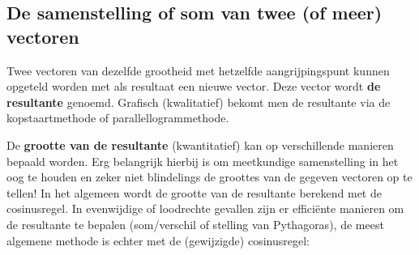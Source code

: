 \documentclass{ximera}
\begin{document}
\subsection*{De samenstelling of som van twee (of meer) vectoren}

Twee vectoren van dezelfde grootheid met hetzelfde aangrijpingspunt kunnen opgeteld worden met als resultaat een nieuwe vector. 
Deze vector wordt \textbf{de resultante} genoemd. 
Grafisch (kwalitatief) bekomt men de resultante via de kopstaartmethode of parallellogrammethode.  %

\begin{image}[0.3\textwidth]
\end{image}


De \textbf{grootte van de resultante} (kwantitatief) kan op verschillende manieren bepaald worden. 
Erg belangrijk hierbij is om meetkundige samenstelling in het oog te houden en zeker niet blindelings de groottes van de gegeven vectoren op te tellen! 
In het algemeen wordt de grootte van de resultante berekend met de cosinusregel. 
In evenwijdige of loodrechte gevallen zijn er efficiënte manieren om de resultante te bepalen (som/verschil of stelling van Pythagoras), de meest algemene methode is echter met de (gewijzigde) cosinusregel:
\end{document}

